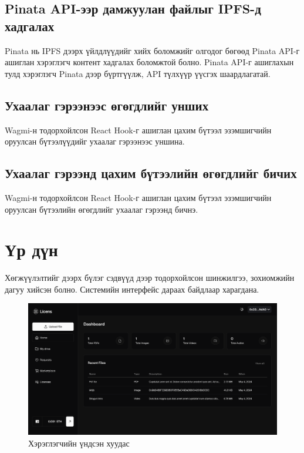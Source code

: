 


\subsection{Pinata API-ээр дамжуулан файлыг IPFS-д хадгалах}
Pinata нь IPFS дээрх үйлдлүүдийг хийх боломжийг олгодог бөгөөд Pinata API-г ашиглан хэрэглэгч контент хадгалах боломжтой болно. Pinata API-г ашиглахын тулд хэрэглэгч Pinata дээр бүртгүүлж, API түлхүүр үүсгэх шаардлагатай.


\subsection{Ухаалаг гэрээнээс өгөгдлийг унших}
Wagmi-н тодорхойлсон React Hook-г ашиглан цахим бүтээл эзэмшигчийн оруулсан бүтээлүүдийг ухаалаг гэрээнээс уншина.


\subsection{Ухаалаг гэрээнд цахим бүтээлийн өгөгдлийг бичих}
Wagmi-н тодорхойлсон React Hook-г ашиглан цахим бүтээл эзэмшигчийн оруулсан бүтээлийн өгөгдлийг ухаалаг гэрээнд бичнэ.



\newpage
\section{Үр дүн}
Хөгжүүлэлтийг дээрх бүлэг сэдвүүд дээр тодорхойлсон шинжилгээ, зохиомжийн дагуу хийсэн болно. Системийн интерфейс дараах байдлаар харагдана.

\begin{figure}[h!]
	\centering
	\includegraphics[scale=0.15]{src/images/dashboard.png}
	\caption{Хэрэглэгчийн үндсэн хуудас}
\end{figure}

